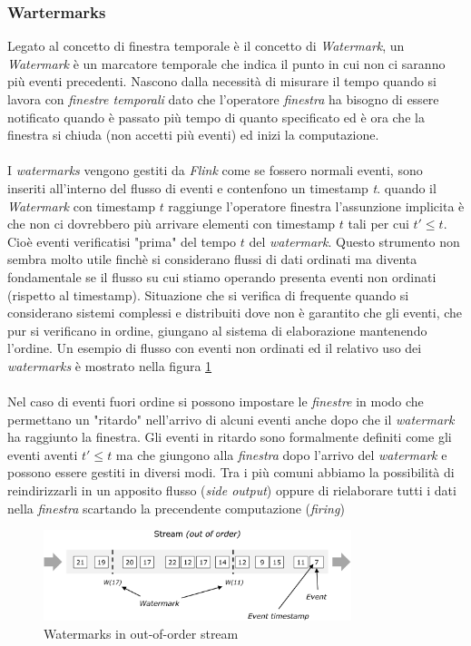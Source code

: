 \subsubsection{Wartermarks}
\label{subsubsec:flink_watermarks}
Legato al concetto di finestra temporale è il concetto di \textit{Watermark}, un \textit{Watermark} è un marcatore temporale che indica il punto in cui non ci saranno più eventi precedenti.
Nascono dalla necessità di misurare il tempo quando si lavora con \textit{finestre temporali} dato che l'operatore \textit{finestra} ha bisogno di essere notificato
quando è passato più tempo di quanto specificato ed è ora che la finestra si chiuda (non accetti più eventi) ed inizi la computazione.\\\\
I \textit{watermarks} vengono gestiti da \textit{Flink} come se fossero normali eventi, sono inseriti all'interno del flusso di eventi e contenfono un timestamp \textit{t}.
quando il \textit{Watermark} con timestamp $t$ raggiunge l'operatore finestra l'assunzione implicita è che non ci dovrebbero più arrivare elementi con timestamp $t$ tali per cui $t' \leq t$.
Cioè eventi verificatisi "prima" del tempo $t$ del \textit{watermark}.
Questo strumento non sembra molto utile finchè si considerano flussi di dati ordinati ma diventa fondamentale se il flusso su cui stiamo operando presenta eventi
non ordinati (rispetto al timestamp).
Situazione che si verifica di frequente quando si considerano sistemi complessi e distribuiti dove non è garantito che gli eventi, che pur si verificano in ordine,
giungano al sistema di elaborazione mantenendo l'ordine. Un esempio di flusso con eventi non ordinati ed il relativo uso dei \textit{watermarks} è mostrato nella figura \ref{fig:watermark}\\\\
Nel caso di eventi fuori ordine si possono impostare le \textit{finestre} in modo che permettano un "ritardo" nell'arrivo di alcuni eventi anche dopo che il \textit{watermark} ha raggiunto la finestra.
Gli eventi in ritardo sono formalmente definiti come gli eventi aventi $t' \leq t$ ma che giungono alla \textit{finestra} dopo l'arrivo del \textit{watermark} e possono essere gestiti in diversi modi.
Tra i più comuni abbiamo la possibilità di reindirizzarli in un apposito flusso (\textit{side output}) oppure di rielaborare tutti i dati nella \textit{finestra} scartando la precendente computazione (\textit{firing})
\begin{figure}[htbp]
    \centering
    \includegraphics[width=0.8\textwidth]{images/flink/watermark_out_of_order.png}
    \caption{Watermarks in out-of-order stream}
    \label{fig:watermark}
\end{figure}

